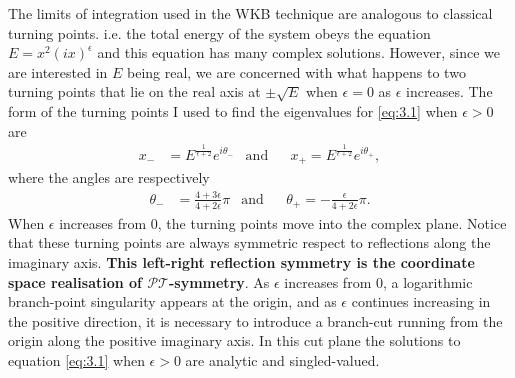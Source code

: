 \documentclass[12pt, a4paper]{report}
\newcommand\PT{\(\mathcal{PT}\)}
\begin{document}
The limits of integration used in the WKB technique are analogous to classical turning points. i.e. the total energy of the system obeys the equation $E = x^2 (ix)^{\epsilon}$ and this equation has many complex solutions. However, since we are interested in $E$ being real, we are concerned with what happens to two turning points that lie on the real axis at $\pm \sqrt{E}$ when $\epsilon = 0$ as $\epsilon$ increases\cite{PTsymmetricQM,MakingSense}.
The form of the turning points I used to find the eigenvalues for \ref{eq:3.1} when $\epsilon>0$ are
\begin{align}
x_{-}& = 
E^{\frac{1}{\epsilon + 2}}
e^{i\theta_{-}}
&\mathrm{and}&
&x_{+} = E^{\frac{1}{\epsilon + 2}} e^{i\theta_{+}},
\end{align}
where the angles are respectively
\begin{align}
\theta_{-}& = \frac{4 + 3\epsilon}{4 + 2 \epsilon} \pi
&\mathrm{and}&
&\theta_{+} = - \frac{\epsilon}{4 + 2 \epsilon} \pi.
\end{align}
When $\epsilon$ increases from 0, the turning points move into the complex plane. Notice that these turning points are always symmetric respect to reflections along the imaginary axis. \textbf{This left-right reflection symmetry is the coordinate space realisation of \PT-symmetry}\cite{PTsymmetricQM}.
As $\epsilon$ increases from 0, a logarithmic branch-point singularity appears at the origin, and as $\epsilon$ continues increasing in the positive direction, it is necessary to introduce a branch-cut running from the origin along the positive imaginary axis. In this cut plane the solutions to equation \ref{eq:3.1} when $\epsilon>0$ are analytic and singled-valued\cite{PTsymmetricQM}.
\end{document}
